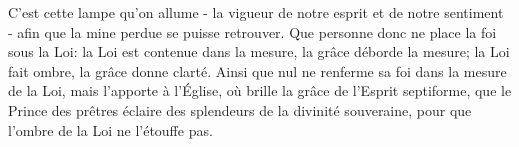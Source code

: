 C'est cette lampe qu'on allume
	- la vigueur de notre esprit et de notre sentiment -
	afin que la mine perdue se puisse retrouver.
Que personne donc ne place la foi sous la Loi:
	la Loi est contenue dans la mesure, la grâce déborde la mesure;
	la Loi fait ombre, la grâce donne clarté.
Ainsi que nul ne renferme sa foi dans la mesure de la Loi, 
	mais l'apporte à l'Église, où brille la grâce de l'Esprit septiforme, 
	que le Prince des prêtres éclaire des splendeurs de la divinité souveraine,
	pour que l'ombre de la Loi ne l'étouffe pas.